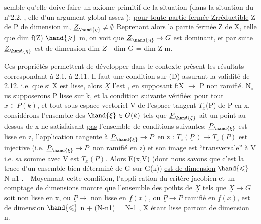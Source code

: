 semble qu'elle doive faire un axiome primitif de la situation (dans la
situation du n°2.2. , elle  d'un argument global assez  ):
\uline{pour toute partie fermée Zrréductible} Z \uline{de} P d\uline{e dimension} m, $\underline{Z}_{\hand{\eta}} \neq \emptyset$ 
 Reprenant alors la
partie fermée Z de X, telle que dim f(Z) $\hand{\geqslant}$ m, on voit que $\underline{Z}_{\hand{\eta}} \rightarrow G$ est
dominant, et par suite $\underline{Z}_{\hand{\eta}}$ est de dimension dim $\underline{Z}$ - dim G = dim Z-m.

Ces propriétés permettent de développer dans le contexte présent
les résultats correspondant à 2.1. à 2.11. Il faut une condition sur (D)
assurant la validité de 2.12. i.e. que si X est lisse, alors $\underline{X}$ l'est
, en supposant f:X $\longrightarrow$ P non ramifié. N$_{\mathrm{o}}$us supposerons
 P \uline{lisse sur} k, et la condition suivante vérifiée: pour
tout $x \in P(k)$, et tout sous-espace vectoriel V  de l'espace tangent
$T_x$(P) de P en x, considérons l'ensemble  des $\hand{\xi} \in G(k)$ tels que
$\underline{P}_{\hand{\xi}}$ ait un point au dessus de x 
ne satisfaisant \uline{pas} l'ensemble de conditions suivantes: $\underline{P}_{\hand{\xi}}$ est lisse en
z, 
l'application tangente à $\underline{P}_{\hand{\xi}} \rightarrow P$ en z : $T_z(\underline{P}\ ) \rightarrow T_x(P)$ est injective
(i.e. $\underline{P}_{\hand{\xi}} \rightarrow P$ non ramifié en z) et son image est ``transversale'' à V
i.e. sa somme avec V est $T_x(P)$. \uline{Alors} E(x,V) (dont nous savons que
c'est la trace d'un ensemble   bien déterminé de G sur G(k))
\uline{est de dimension} $\hand{\leqslant}$ N-n\unsure{\over{+}{-}}1 . - Moyennant cette condition,  l'appli\unsure{:}
cation du critère jacobien et un comptage de dimensions montre que
l'ensemble des poihts de $\underline{X}$ tels que $\underline{X} \longrightarrow G$ soit non lisse en x, \uline{ou}
$\underline{P} \longrightarrow$  non lisse en $\underline{f}(x)$, ou $\underline{P} \longrightarrow P$ ramifié en $\underline{f}(x)$, est de
dimension $\hand{\leqslant}$ n + (N-n\unsure{\over{+}{-}}1) = N-1 , \hand{(}X étant lisse partout de dimension n\hand{)}.


